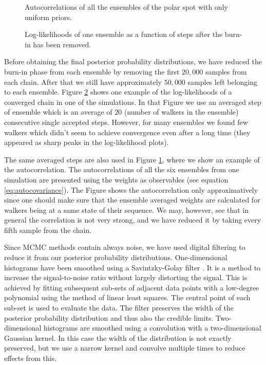 \documentclass{wihuri}
\begin{document}
\begin{figure}
\centerline{}
\caption{Autocorrelations of all the ensembles of the polar spot with only uniform priors.
\label{fig:acexample}}
\end{figure}


\begin{figure}
\centerline{}
\caption{Log-likelihoods of one ensemble as a function of steps after the burn-in has been removed.
\label{fig:wexample}}
\end{figure}

Before obtaining the final posterior probability distributions, we have reduced the burn-in phase from each ensemble by removing the first $20,000$ samples from each chain. After that we still have approximately $50,000$ samples left belonging to each ensemble. Figure \ref{fig:wexample} shows one example of the log-likelihoods of a converged chain in one of the simulations. In that Figure we use an averaged step of ensemble which is an average of $20$ (number of walkers in the ensemble) consecutive single accepted steps. However, for many ensembles we found few walkers which didn't seem to achieve convergence even after a long time (they appeared as sharp peaks in the log-likelihood plots).

The same averaged steps are also used in Figure \ref{fig:acexample}, where we show an example of the autocorrelation. The autocorrelations of all the six ensembles from one simulation are presented using the weights as observables (see equation \ref{eq:autocovariance}). The Figure shows the autocorrelation only approximatively since one should make sure that the ensemble averaged weights are calculated for walkers being at a same state of their sequence. We may, however, see that in general the correlation is not very strong, and we have reduced it by taking every fifth sample from the chain.%

Since MCMC methods contain always noise, we have used digital filtering to reduce it from our posterior probability distributions. One-dimensional histograms have been smoothed using a Savintzky-Golay filter \cite{savgol}.
It is a method to increase the signal-to-noise ratio without largely distorting the signal. This is achieved by fitting subsequent sub-sets of adjacent data points with a low-degree polynomial using the method of linear least squares. The central point of each sub-set is used to evaluate the data. The filter preserves the width of the posterior probability distribution and thus also the credible limits. Two-dimensional histograms are smoothed using a convolution with a two-dimensional Gaussian kernel. %
In this case the width of the distribution is not exactly preserved, but we use a narrow kernel and convolve multiple times to reduce effects from this. 
\end{document}

